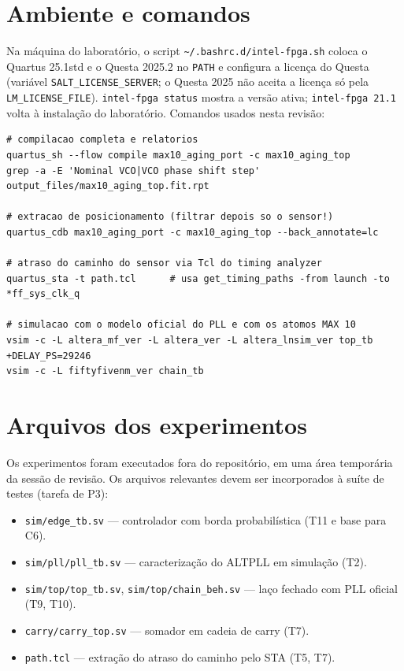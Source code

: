 \documentclass[11pt,a4paper]{article}
\newcommand{\file}[1]{\texttt{\small #1}}
\begin{document}
\section{Ambiente e comandos}
\label{ap:comandos}
Na máquina do laboratório, o script \file{\textasciitilde/.bashrc.d/intel-fpga.sh} coloca o Quartus
25.1std e o Questa 2025.2 no \texttt{PATH} e configura a licença do Questa (variável
\texttt{SALT\_LICENSE\_SERVER}; o Questa 2025 não aceita a licença só pela \texttt{LM\_LICENSE\_FILE}).
\texttt{intel-fpga status} mostra a versão ativa; \texttt{intel-fpga 21.1} volta à instalação do
laboratório. Comandos usados nesta revisão:
\begin{lstlisting}[style=sh]
# compilacao completa e relatorios
quartus_sh --flow compile max10_aging_port -c max10_aging_top
grep -a -E 'Nominal VCO|VCO phase shift step' output_files/max10_aging_top.fit.rpt

# extracao de posicionamento (filtrar depois so o sensor!)
quartus_cdb max10_aging_port -c max10_aging_top --back_annotate=lc

# atraso do caminho do sensor via Tcl do timing analyzer
quartus_sta -t path.tcl      # usa get_timing_paths -from launch -to *ff_sys_clk_q

# simulacao com o modelo oficial do PLL e com os atomos MAX 10
vsim -c -L altera_mf_ver -L altera_ver -L altera_lnsim_ver top_tb +DELAY_PS=29246
vsim -c -L fiftyfivenm_ver chain_tb
\end{lstlisting}

\section{Arquivos dos experimentos}
\label{ap:arquivos}
Os experimentos foram executados fora do repositório, em uma área temporária da sessão de
revisão. Os arquivos relevantes devem ser incorporados à suíte de testes (tarefa de P3):
\begin{itemize}
  \item \file{sim/edge\_tb.sv} --- controlador com borda probabilística (T11 e base para C6).
  \item \file{sim/pll/pll\_tb.sv} --- caracterização do ALTPLL em simulação (T2).
  \item \file{sim/top/top\_tb.sv}, \file{sim/top/chain\_beh.sv} --- laço fechado com PLL oficial (T9, T10).
  \item \file{carry/carry\_top.sv} --- somador em cadeia de carry (T7).
  \item \file{path.tcl} --- extração do atraso do caminho pelo STA (T5, T7).
\end{itemize}
\end{document}
